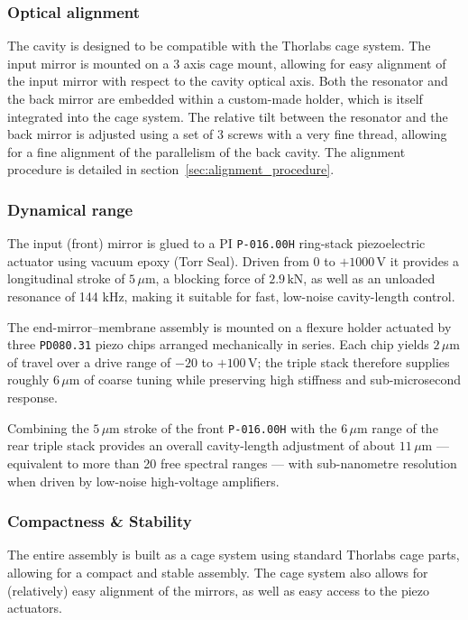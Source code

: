 \subsubsection{Optical alignment}
The cavity is designed to be compatible with the Thorlabs cage system. The input mirror is mounted on a 3 axis cage mount, allowing for easy alignment of the input mirror with respect to the cavity optical axis. Both the resonator and the back mirror are embedded within a custom-made holder, which is itself integrated into the cage system. The relative tilt between the resonator and the back mirror is adjusted using a set of 3 screws with a very fine thread, allowing for a fine alignment of the parallelism of the back cavity. The alignment procedure is detailed in section~\ref{sec:alignment_procedure}.

\subsubsection{Dynamical range}

The input (front) mirror is glued to a PI \texttt{P-016.00H} ring-stack piezoelectric actuator using vacuum epoxy (Torr Seal). Driven from 0 to $+1000\,\mathrm{V}$ it provides a longitudinal stroke of $5\,\mu\text{m}$, a blocking force of $2.9\,\mathrm{kN}$, as well as an unloaded resonance of 144 kHz, making it suitable for fast, low-noise cavity-length control.

The end-mirror–membrane assembly is mounted on a flexure holder actuated by three \texttt{PD080.31} piezo chips arranged mechanically in series. Each chip yields $2\,\mu\text{m}$ of travel over a drive range of $-20$ to $+100\,\mathrm{V}$; the triple stack therefore supplies roughly $6\,\mu\text{m}$ of coarse tuning while preserving high stiffness and sub-microsecond response.

Combining the $5\,\mu\text{m}$ stroke of the front \texttt{P-016.00H} with the $6\,\mu\text{m}$ range of the rear triple stack provides an overall cavity-length adjustment of about $11\,\mu\text{m}$ — equivalent to more than 20 free spectral ranges — with sub-nanometre resolution when driven by low-noise high-voltage amplifiers.


\subsubsection{Compactness \& Stability}
The entire assembly is built as a cage system using standard Thorlabs cage parts, allowing for a compact and stable assembly\cite{Thorlabs_cage}. The cage system also allows for (relatively) easy alignment of the mirrors, as well as easy access to the piezo actuators.

